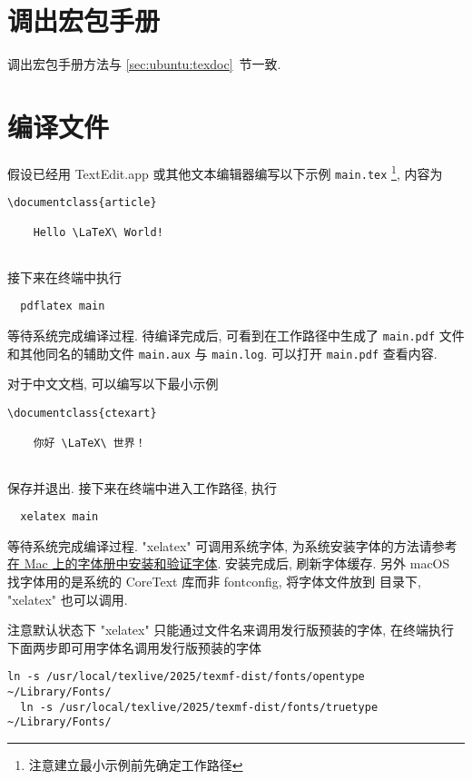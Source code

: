 \section{调出宏包手册}

调出宏包手册方法与 \ref{sec:ubuntu:texdoc}~节一致.

\section{编译文件}

假设已经用 TextEdit.app 或其他文本编辑器编写以下示例 \texttt{main.tex}%
\footnote{注意建立最小示例前先确定工作路径},
内容为
\begin{lstlisting}[language = mwe]
  \documentclass{article}
  
    Hello \LaTeX\ World!
  
\end{lstlisting}
接下来在\textsf{终端}中执行
\begin{lstlisting}
  pdflatex main
\end{lstlisting}
等待系统完成编译过程. 
待编译完成后, 可看到在工作路径中生成了 \texttt{main.pdf}
文件和其他同名的辅助文件 \texttt{main.aux} 与 \texttt{main.log}.
可以打开 \texttt{main.pdf} 查看内容.

对于中文文档, 可以编写以下最小示例%
\begin{lstlisting}[language = mwe]
  \documentclass{ctexart}
  
    你好 \LaTeX\ 世界！
  
\end{lstlisting}
保存并退出.
接下来在\textsf{终端}中进入工作路径,
执行
\begin{lstlisting}
  xelatex main
\end{lstlisting}
等待系统完成编译过程.
"xelatex" 可调用系统字体,
为系统安装字体的方法请参考%
\href{https://support.apple.com/zh-cn/guide/font-book/fntbk1000/mac}{在 Mac 上的字体册中安装和验证字体}.
安装完成后, 刷新字体缓存.
另外 macOS 找字体用的是系统的 CoreText 库而非 fontconfig,
将字体文件放到  目录下,
"xelatex" 也可以调用.

注意默认状态下 "xelatex" 只能通过文件名来调用发行版预装的字体,
在\textsf{终端}执行下面两步即可用字体名调用发行版预装的字体
\begin{lstlisting}[deletekeywords = local]
  ln -s /usr/local/texlive/2025/texmf-dist/fonts/opentype ~/Library/Fonts/
  ln -s /usr/local/texlive/2025/texmf-dist/fonts/truetype ~/Library/Fonts/
\end{lstlisting}

